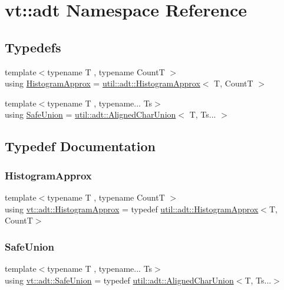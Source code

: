 \hypertarget{namespacevt_1_1adt}{}\section{vt\+:\+:adt Namespace Reference}
\label{namespacevt_1_1adt}
\subsection*{Typedefs}
\begin{DoxyCompactItemize}
\item 
{\footnotesize template$<$typename T , typename CountT $>$ }\\using \hyperlink{namespacevt_1_1adt_a486971e142bc22434d6afe695c43b599}{Histogram\+Approx} = \hyperlink{structvt_1_1util_1_1adt_1_1_histogram_approx}{util\+::adt\+::\+Histogram\+Approx}$<$ T, CountT $>$
\item 
{\footnotesize template$<$typename T , typename... Ts$>$ }\\using \hyperlink{namespacevt_1_1adt_ad2a7bbcb5f4735ae9d847f96ee62f144}{Safe\+Union} = \hyperlink{structvt_1_1util_1_1adt_1_1_aligned_char_union}{util\+::adt\+::\+Aligned\+Char\+Union}$<$ T, Ts... $>$
\end{DoxyCompactItemize}


\subsection{Typedef Documentation}
\mbox{\label{namespacevt_1_1adt_a486971e142bc22434d6afe695c43b599}} 
\subsubsection{\texorpdfstring{Histogram\+Approx}{HistogramApprox}}
{\footnotesize\ttfamily template$<$typename T , typename CountT $>$ \\
using \hyperlink{namespacevt_1_1adt_a486971e142bc22434d6afe695c43b599}{vt\+::adt\+::\+Histogram\+Approx} = typedef \hyperlink{structvt_1_1util_1_1adt_1_1_histogram_approx}{util\+::adt\+::\+Histogram\+Approx}$<$T, CountT$>$}

\mbox{\label{namespacevt_1_1adt_ad2a7bbcb5f4735ae9d847f96ee62f144}} 
\subsubsection{\texorpdfstring{Safe\+Union}{SafeUnion}}
{\footnotesize\ttfamily template$<$typename T , typename... Ts$>$ \\
using \hyperlink{namespacevt_1_1adt_ad2a7bbcb5f4735ae9d847f96ee62f144}{vt\+::adt\+::\+Safe\+Union} = typedef \hyperlink{structvt_1_1util_1_1adt_1_1_aligned_char_union}{util\+::adt\+::\+Aligned\+Char\+Union}$<$T, Ts...$>$}

